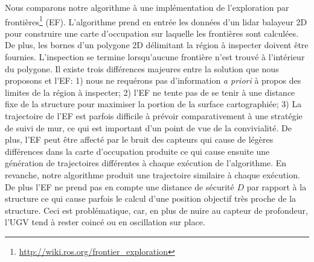 Nous comparons notre algorithme à une implémentation de l'exploration par frontières\footnote{\url{http://wiki.ros.org/frontier_exploration}} (EF). L'algorithme prend en entrée les données d'un lidar balayeur 2D pour construire une carte d'occupation sur laquelle les frontières sont calculées. De plus, les bornes d'un polygone 2D délimitant la région à inspecter doivent être fournies. L'inspection se termine lorsqu’aucune frontière n'est trouvé à l'intérieur du polygone. Il existe trois différences majeures entre la solution que nous proposons et l'EF: 1) nous ne requérons pas d'information \textit{a priori} à propos des limites de la région à inspecter; 2) l'EF ne tente pas de se tenir à une distance fixe de la structure pour maximiser la portion de la surface cartographiée; 3) La trajectoire de l'EF est parfois difficile à prévoir comparativement à une stratégie de suivi de mur, ce qui est important d'un point de vue de la convivialité. De plus, l'EF peut être affecté par le bruit des capteurs qui cause de légères différences dans la carte d'occupation produite ce qui cause ensuite une génération de trajectoires différentes à chaque exécution de l'algorithme. En revanche, notre algorithme produit une trajectoire similaire à chaque exécution. De plus l'EF ne prend pas en compte une distance de sécurité $D$ par rapport à la structure ce qui cause parfois le calcul d'une position objectif très proche de la structure. Ceci est problématique, car, en plus de nuire au capteur de profondeur, l'UGV tend à rester coincé ou en oscillation sur place.

